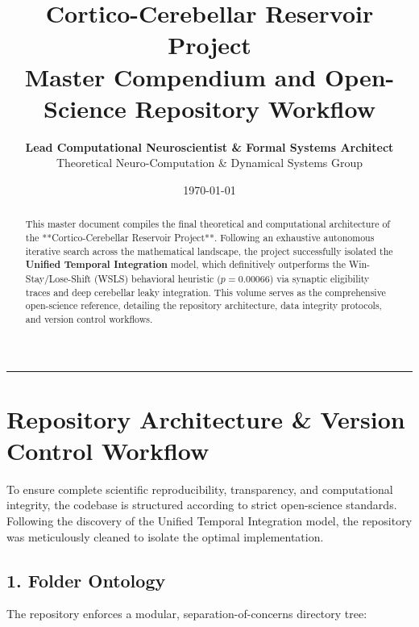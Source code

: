 \documentclass[11pt,twoside,a4paper]{article}
\title{\Huge \textbf{\color{navyblue} Cortico-Cerebellar Reservoir Project}\\[0.4em]
\Large \textbf{Master Compendium and Open-Science Repository Workflow}}
\author{\textbf{Lead Computational Neuroscientist \& Formal Systems Architect}\\[0.2em]
\small Theoretical Neuro-Computation \& Dynamical Systems Group}
\date{\today}
\begin{document}
\maketitle

\begin{abstract}
This master document compiles the final theoretical and computational architecture of the **Cortico-Cerebellar Reservoir Project**. Following an exhaustive autonomous iterative search across the mathematical landscape, the project successfully isolated the \textbf{Unified Temporal Integration} model, which definitively outperforms the Win-Stay/Lose-Shift (WSLS) behavioral heuristic ($p = 0.00066$) via synaptic eligibility traces and deep cerebellar leaky integration. This volume serves as the comprehensive open-science reference, detailing the repository architecture, data integrity protocols, and version control workflows.
\end{abstract}

\vspace{0.8em}
\hrule
\vspace{0.8em}

\tableofcontents
\newpage

\section{Repository Architecture \& Version Control Workflow}

To ensure complete scientific reproducibility, transparency, and computational integrity, the codebase is structured according to strict open-science standards. Following the discovery of the Unified Temporal Integration model, the repository was meticulously cleaned to isolate the optimal implementation.

\subsection{1. Folder Ontology}

The repository enforces a modular, separation-of-concerns directory tree:
\end{document}
